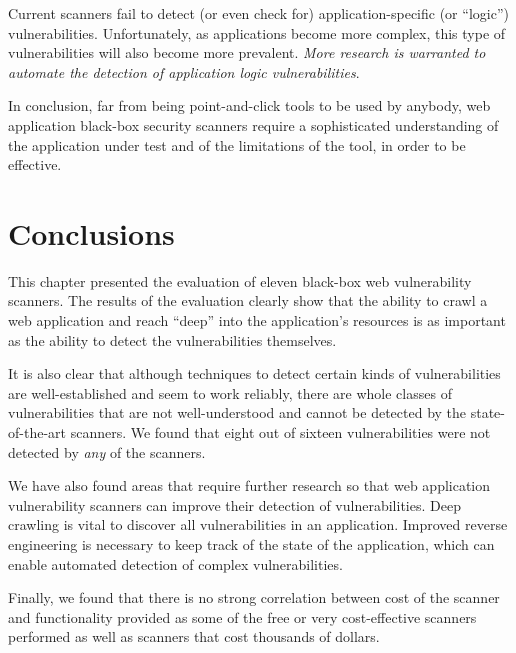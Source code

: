Current scanners fail to detect (or even check for) application-specific
(or ``logic'') vulnerabilities. 
Unfortunately, as applications become more complex, this type of
vulnerabilities will also become more prevalent.
{\em More research is warranted to automate the detection of application
logic vulnerabilities}.

In conclusion, far from being point-and-click tools to be used by
anybody, web application black-box security scanners require a
sophisticated understanding of the application under test and of the
limitations of the tool, in order to be effective.

\section{Conclusions}

This chapter presented  the evaluation  of eleven  black-box  web vulnerability
scanners.   The results of  the evaluation  clearly show  that the  ability to
crawl a web application and reach ``deep'' into the application's resources is
as important as the ability to detect the vulnerabilities themselves.

It  is  also   clear  that  although  techniques  to   detect  certain  kinds  of
vulnerabilities are well-established and seem to work reliably, there are whole
classes of vulnerabilities that are not well-understood and cannot be detected
by the  state-of-the-art scanners. We found that  eight out of
sixteen vulnerabilities were not detected by \emph{any} of the
scanners.

We have also found areas that require further research so that web
application vulnerability scanners can improve their detection of
vulnerabilities. Deep crawling is vital to discover all
vulnerabilities in an application. Improved reverse engineering is
necessary to keep track of the state of the application, which can enable
automated detection of complex vulnerabilities.

Finally, we found that there is no strong correlation between cost of the scanner
and functionality provided as some of the free or very cost-effective scanners
performed as well as scanners that cost thousands of dollars.


